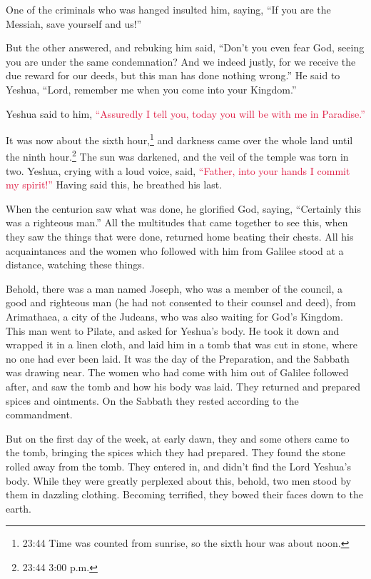 \myverse{}One of the criminals who was hanged insulted him, saying, “If
you are the Messiah, save yourself and us!”

\myverse{}But the other answered, and rebuking him said, “Don’t you even
fear God, seeing you are under the same condemnation?
\myverse{}And we indeed justly, for we receive the due reward for our deeds, but this
man has done nothing wrong.”
\myverse{}He said to Yeshua, “Lord, remember me when you come into your Kingdom.”

\myverse{}Yeshua said to him,
\textcolor{crimson}{“Assuredly I tell you, today you will be with me in Paradise.”}

\myverse{}It was now about the sixth hour,\footnote{23:44 Time was counted from sunrise, so the sixth hour was about noon.} and darkness came over
the whole land until the ninth hour.\footnote{23:44 3:00 p.m.}
\myverse{}The sun was darkened, and the veil of the temple was torn in two.
\myverse{}Yeshua, crying with a loud voice, said,
\textcolor{crimson}{“Father, into your hands I commit my spirit!”} Having said this, he breathed his last.

\myverse{}When the centurion saw what was done, he glorified God, saying,
“Certainly this was a righteous man.”
\myverse{}All the multitudes that came together to see this, when they saw the things
that were done, returned home beating their chests.
\myverse{}All his acquaintances and the women who followed with him from Galilee stood
at a distance, watching these things.

\myverse{}Behold, there was a man named Joseph, who was a member of the
council, a good and righteous man
\myverse{}(he had not consented to their counsel and deed), from Arimathaea, a city
of the Judeans, who was also waiting for God’s Kingdom.
\myverse{}This man went to Pilate, and asked for Yeshua’s body.
\myverse{}He took it down and wrapped it in a linen cloth, and laid him in a tomb that
was cut in stone, where no one had ever been laid.
\myverse{}It was the day of the Preparation, and the Sabbath was drawing near.
\myverse{}The women who had come with him out of Galilee followed after, and saw the
tomb and how his body was laid.
\myverse{}They returned and prepared spices and ointments. On the Sabbath they rested
according to the commandment.


\mychapter{} \myverse*{}But on the first day of the week, at early dawn, they and some
others came to the tomb, bringing the spices which they had prepared.
\myverse{}They found the stone rolled away from the tomb.
\myverse{}They entered in, and didn’t find the Lord Yeshua’s body.
\myverse{}While they were greatly perplexed about this, behold, two men stood by them
in dazzling clothing.
\myverse{}Becoming terrified, they bowed their faces down to the earth.


